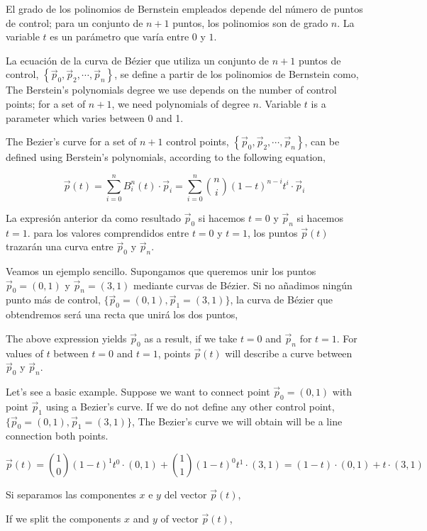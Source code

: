 \begin{paracol}{2}
El grado de los polinomios de Bernstein empleados depende del número de puntos de control; para un conjunto de $n+1$ puntos, los polinomios son de grado $n$. La variable $t$ es un parámetro que varía entre $0$ y $1$.

La ecuación de la curva de Bézier que utiliza un conjunto de $n+1$ puntos de control, $\left\lbrace\vec{p}_0, \vec{p}_2, \cdots, \vec{p}_n\right\rbrace$, se define a partir de los polinomios de Bernstein como,
\switchcolumn
The Berstein's polynomials degree we use depends on the number of control points; for a set of $n+1$, we need polynomials of degree $n$. Variable $t$ is a parameter which varies between 0 and 1.

The Bezier's curve for a set of $n+1$ control points,  $\left\lbrace\vec{p}_0, \vec{p}_2, \cdots, \vec{p}_n\right\rbrace$, can be defined using Berstein's polynomials, according to the following equation,  
\end{paracol}
\begin{equation*}
\vec{p}(t) = \sum_{i = 0}^n B_i^n(t) \cdot \vec{p}_i = \sum_{i = 0}^n \binom{n}{i}\left(1-t\right)^{n-i}t^i  \cdot \vec{p}_i
\end{equation*}
\begin{paracol}{2}
La expresión anterior da como resultado $\vec{p}_0$ si hacemos $t = 0$ y $\vec{p}_n$ si hacemos $t = 1$. para los valores comprendidos entre $t=0$ y $t=1$, los puntos $\vec{p}(t)$  trazarán una curva entre $\vec{p}_0$  y $\vec{p}_n$.

Veamos un ejemplo sencillo. Supongamos que queremos unir los puntos $\vec{p}_0 = (0,1)$ y $\vec{p}_n = (3,1)$ mediante curvas de Bézier. Si no añadimos ningún punto más de control, $\lbrace\vec{p}_0 = (0,1), \vec{p}_1 = (3,1)\rbrace$, la curva de Bézier que obtendremos será una recta que unirá los dos puntos,

\switchcolumn
The above expression yields $\vec{p}_0$ as a result, if we take $t=0$ and $\vec{p}_n$ for $t=1$. For values of $t$ between $t=0$ and $t=1$, points $\vec{p}(t)$ will describe a curve between $\vec{p}_0$  y $\vec{p}_n$.  

Let's see a basic example. Suppose we want to connect point $\vec{p}_0 = (0,1)$ with point $\vec{p}_1$ using a Bezier's curve. If we do not define any other control point, $\lbrace\vec{p}_0 = (0,1), \vec{p}_1 = (3,1)\rbrace$, The Bezier's curve we will obtain will be a line connection both points.
\end{paracol}
\begin{equation*}
\vec{p}(t) = \binom{1}{0}\left(1-t\right)^{1}t^0  \cdot (0,1) +  \binom{1}{1}\left(1-t\right)^{0}t^1  \cdot (3,1) = \left(1-t\right)  \cdot (0,1) + t\cdot (3,1)
\end{equation*} 
\begin{paracol}{2}
Si separamos las componentes $x$ e $y$ del vector $\vec{p}(t)$,

\switchcolumn
If we split the components $x$ and $y$ of vector $\vec{p}(t)$,
\end{paracol}


